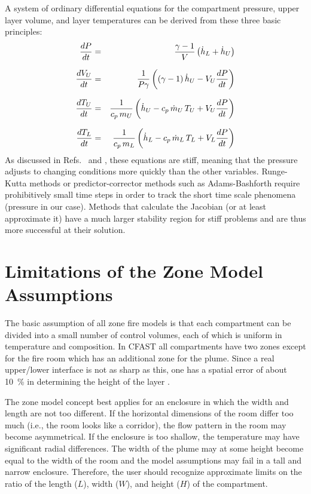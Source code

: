 \ee
A system of ordinary differential equations for the compartment pressure, upper layer volume, and layer temperatures can be derived from these three basic principles: 
\begin{eqnarray}
\frac{d {P}}{dt} &=& \frac{{\gamma-1}}{{V}} \left( \dot h_L + \dot h_U \right)  \\[.1in]
\frac{d {V_U}}{dt} &=& \frac{1}{P \gamma} \left( (\gamma-1) \, \dot h_U - V_U \frac{d {P}}{dt} \right) \\[.1in]
\frac{d {T_U}}{dt} &=& \frac{1}{c_p \, m_U} \left( \dot h_U - c_p \, \dot m_U \, T_U + V_U \frac{d {P}}{dt} \right) \\[.1in]
\frac{d {T_L}}{dt} &=& \frac{1}{c_p \, m_L} \left( \dot h_L - c_p \, \dot m_L \, T_L + V_L \frac{d {P}}{dt} \right) 
\end{eqnarray}
As discussed in Refs.~\cite{Forney:1994} and \cite{Rehm:1992}, these equations are stiff, meaning that the pressure adjusts to changing conditions more quickly than the other variables. Runge-Kutta methods or predictor-corrector methods such as Adams-Bashforth require prohibitively small time steps in order to track the short time scale phenomena (pressure in our case). Methods that calculate the Jacobian (or at least approximate it) have a much larger stability region for stiff problems and are thus more successful at their solution.

\section{Limitations of the Zone Model Assumptions} \label{sec:ZoneModelAssumptions}

The basic assumption of all zone fire models is that each compartment can be divided into a
small number of control volumes, each of which is uniform in temperature and composition. In
CFAST all compartments have two zones except for the fire room which has an additional zone
for the plume. Since a real upper/lower interface is not as sharp as this, one has a spatial error of
about 10~\% in determining the height of the layer \cite{Steckler:1982, Quintiere:1984}.

The zone model concept best applies for an enclosure in which the width and length are not too
different. If the horizontal dimensions of the room differ too much (i.e., the room looks like a
corridor), the flow pattern in the room may become asymmetrical. If the enclosure is too
shallow, the temperature may have significant radial differences. The width of the plume may at
some height become equal to the width of the room and the model assumptions may fail in a tall
and narrow enclosure. Therefore, the user should recognize approximate limits on the ratio of the
length ($L$), width ($W$), and height ($H$) of the compartment.

